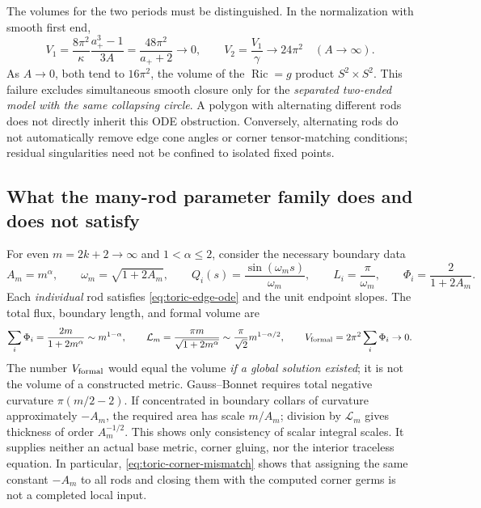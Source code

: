 \documentclass[a4paper,11pt]{article}
\numberwithin{equation}{section}
\theoremstyle{definition}
\newcommand{\Ric}{\operatorname{Ric}}
\begin{document}
The volumes for the two periods must be distinguished. In the normalization with smooth first end,
\begin{equation}\label{eq:toric-separated-volume}
 V_1=\frac{8\pi^2}{\kappa}\frac{a_+^3-1}{3A}
     =\frac{48\pi^2}{a_++2}\longrightarrow0,\qquad
 V_2=\frac{V_1}{\gamma}\longrightarrow24\pi^2
 \quad(A\to\infty).
\end{equation}
As $A\to0$, both tend to $16\pi^2$, the volume of the $\Ric=g$ product $S^2\times S^2$.
This failure excludes simultaneous smooth closure only for the \emph{separated two-ended model with the same collapsing circle}.
A polygon with alternating different rods does not directly inherit this ODE obstruction.
Conversely, alternating rods do not automatically remove edge cone angles or corner tensor-matching conditions; residual singularities need not be confined to isolated fixed points.

\subsection{What the many-rod parameter family does and does not satisfy}
For even $m=2k+2\to\infty$ and $1<\alpha\le2$, consider the necessary boundary data
\begin{equation}\label{eq:toric-alpha-data}
 A_m=m^\alpha,\qquad \omega_m=\sqrt{1+2A_m},\qquad
 Q_i(s)=\frac{\sin(\omega_m s)}{\omega_m},\qquad
 L_i=\frac\pi{\omega_m},\qquad \Phi_i=\frac2{1+2A_m}.
\end{equation}
Each \emph{individual} rod satisfies \eqref{eq:toric-edge-ode} and the unit endpoint slopes.
The total flux, boundary length, and formal volume are
\begin{equation}\label{eq:toric-alpha-scales}
 \sum_i\Phi_i=\frac{2m}{1+2m^\alpha}\sim m^{1-\alpha},\qquad
 \mathcal L_m=\frac{\pi m}{\sqrt{1+2m^\alpha}}
     \sim\frac\pi{\sqrt2}m^{1-\alpha/2},\qquad
 V_{\rm formal}=2\pi^2\sum_i\Phi_i\to0.
\end{equation}
The number $V_{\rm formal}$ would equal the volume \emph{if a global solution existed}; it is not the volume of a constructed metric.
Gauss--Bonnet requires total negative curvature $\pi(m/2-2)$.
If concentrated in boundary collars of curvature approximately $-A_m$, the required area has scale $m/A_m$; division by $\mathcal L_m$ gives thickness of order $A_m^{-1/2}$.
This shows only consistency of scalar integral scales. It supplies neither an actual base metric, corner gluing, nor the interior traceless equation.
In particular, \eqref{eq:toric-corner-mismatch} shows that assigning the same constant $-A_m$ to all rods and closing them with the computed corner germs is not a completed local input.
\end{document}
